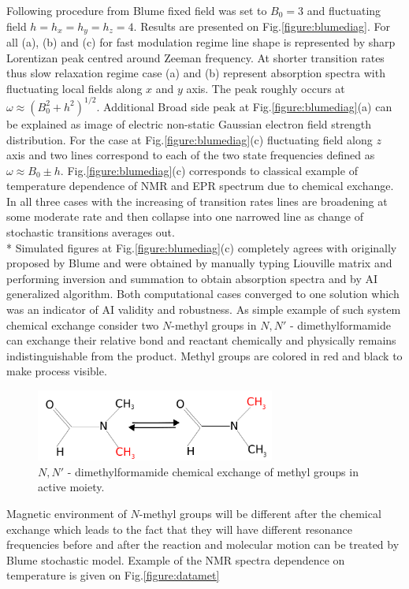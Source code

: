 Following procedure from Blume \cite{blume} fixed field was set to $B_0=3$ and fluctuating field $h=h_x=h_y=h_z=4$. Results are presented on Fig.\ref{figure:blumediag}. For all (a), (b) and (c) for fast modulation regime line shape is represented by sharp Lorentizan peak centred around Zeeman frequency. At shorter transition rates thus slow relaxation regime case (a) and (b) represent absorption spectra with fluctuating local fields along $x$ and $y$ axis. The peak roughly occurs at $\omega\approx(B_0^2+h^2)^{1/2}$. Additional Broad side peak at  Fig.\ref{figure:blumediag}(a) can be explained as image of electric non-static Gaussian electron field strength distribution. For the case at Fig.\ref{figure:blumediag}(c) fluctuating field along $z$ axis and two lines correspond to each of the two state frequencies defined as $\omega\approx B_0\pm h$. Fig.\ref{figure:blumediag}(c) corresponds to classical example of temperature dependence of NMR and EPR spectrum due to chemical exchange. In all three cases with the increasing of transition rates lines are broadening at some moderate rate and then collapse into one narrowed line as change of stochastic transitions averages out. \\*
Simulated figures at Fig.\ref{figure:blumediag}(c) completely agrees with originally proposed by Blume \cite{blume} and were obtained by manually typing Liouville matrix and performing inversion and summation to obtain absorption spectra and by AI generalized algorithm. Both computational cases converged to one solution which was an indicator of AI validity and robustness.  
As simple example of such system chemical exchange consider two $N$-methyl groups in $N,N'$ - dimethylformamide can exchange their relative bond and reactant chemically and physically remains indistinguishable from the product. Methyl groups are colored in red and black to make process visible.       
\begin{figure}[h!]
\centering
\includegraphics[width=0.7\textwidth]{figures/chap2/methil.png}
\caption{$N,N'$ -
dimethylformamide chemical exchange of methyl groups in active moiety.}
\label{figure:methyl}
\end{figure}
Magnetic environment of $N$-methyl groups will be different after the chemical exchange which leads to the fact that they will have different resonance frequencies before and after the reaction and molecular motion can be treated by Blume stochastic model. Example of the NMR spectra dependence on temperature is given on Fig.\ref{figure:datamet} 
